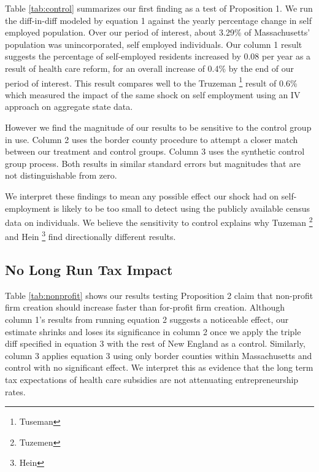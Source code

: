 \documentclass[12pt]{article}
\begin{document}
Table \ref{tab:control} summarizes our first finding as a test of Proposition 1. We run the diff-in-diff modeled by equation 1 against the yearly percentage change in self employed population. Over our period of interest, about 3.29\% of Massachusetts' population was unincorporated, self employed individuals. Our column 1 result suggests the percentage of self-employed residents increased by 0.08 per year as a result of health care reform, for an overall increase of 0.4\% by the end of our period of interest. This result compares well to the Truzeman \footnote{Tuseman} result of 0.6\% which measured the impact of the same shock on self employment using an IV approach on aggregate state data. 

However we find the magnitude of our results to be sensitive to the control group in use. Column 2 uses the border county procedure to attempt a closer match between our treatment and control groups. Column 3 uses the synthetic control group process. Both results in similar standard errors but magnitudes that are not distinguishable from zero. 
\begin{center}
	\begin{table}[H]
		\centering
			\caption{Model (1) estimator of yearly percentage change in self-employment} 
			
		\label{tab:control}
	\end{table}		
\end{center}

We interpret these findings to mean any possible effect our shock had on self-employment is likely to be too small to detect using the publicly available census data on individuals. We believe the sensitivity to control explains why Tuzeman \footnote{Tuzemen} and Hein \footnote{Hein} find directionally different results. 

\subsection{No Long Run Tax Impact}

Table \ref{tab:nonprofit} shows our results testing Proposition 2 claim that non-profit firm creation should increase faster than for-profit firm creation. Although column 1's results from running equation 2 suggests a noticeable effect, our estimate shrinks and loses its significance in column 2 once we apply the triple diff specified in equation 3 with the rest of New England as a control. Similarly, column 3 applies equation 3 using only border counties within Massachusetts and control with no significant effect. We interpret this as evidence that the long term tax expectations of health care subsidies are not attenuating entrepreneurship rates. 
\end{document}
